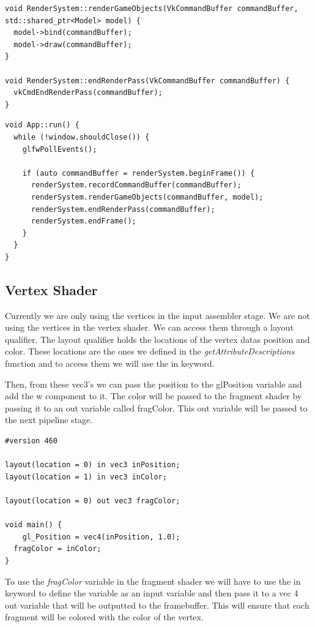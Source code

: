 \documentclass[12pt]{report} \usepackage{preamble}
\begin{document}
\begin{lstlisting}[Language=C++]
void RenderSystem::renderGameObjects(VkCommandBuffer commandBuffer, std::shared_ptr<Model> model) {
  model->bind(commandBuffer);
  model->draw(commandBuffer);
}

void RenderSystem::endRenderPass(VkCommandBuffer commandBuffer) {
  vkCmdEndRenderPass(commandBuffer);
}
\end{lstlisting}

\begin{lstlisting}[Language=C++]
void App::run() {
  while (!window.shouldClose()) {
    glfwPollEvents();

    if (auto commandBuffer = renderSystem.beginFrame()) {
      renderSystem.recordCommandBuffer(commandBuffer);
      renderSystem.renderGameObjects(commandBuffer, model);
      renderSystem.endRenderPass(commandBuffer);
      renderSystem.endFrame();
    }
  }
}
\end{lstlisting}

\subsection{Vertex Shader}

Currently we are only using the vertices in the input assembler stage. We are not using the vertices in the vertex shader.
We can access them through a layout qualifier. The layout qualifier holds the locations of the vertex datas position and color.
These locations are the ones we defined in the \textit{getAttributeDescriptions} function and to access them we will use the in keyword.

Then, from these vec3's we can pass the position to the gl\textunderscore Position variable and add the w component to it.
The color will be passed to the fragment shader by passing it to an out variable called fragColor. This out variable will be passed to the next pipeline stage.

\begin{lstlisting}[Language=C++]
#version 460

layout(location = 0) in vec3 inPosition;
layout(location = 1) in vec3 inColor;

layout(location = 0) out vec3 fragColor;

void main() {
	gl_Position = vec4(inPosition, 1.0);
  fragColor = inColor;
}
\end{lstlisting}

To use the \textit{fragColor} variable in the fragment shader we will have to use the in keyword to define the variable as an input variable
and then pass it to a vec 4 out variable that will be outputted to the framebuffer. This will ensure that each fragment will be colored with the color of the vertex.
\end{document}
